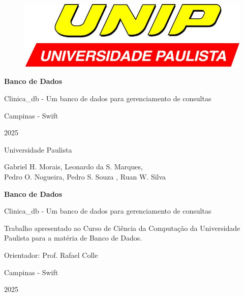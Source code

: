 \documentclass[a4paper,12pt]{article}
\begin{document}
\begin{titlepage}
    \centering
    \begin{figure}[H]
        \centering
        \includegraphics{logoUNIP.jpg}
    \end{figure}
    \vspace{1.5cm}
    \vspace{3cm}
    {\Huge \textbf{Banco de Dados} \par}
    \vspace{1cm}
    {\Large Clinica\_db - Um banco de dados para gerenciamento de consultas\par}
    \vfill
    {\Large Campinas - Swift \par}
    {\Large 2025 \par}
\end{titlepage}

\begin{titlepage}
    \centering
    {\Large Universidade Paulista \par}
    \vspace{1.5cm}
    {\large Gabriel H. Morais, Leonardo da S. Marques, \\Pedro O. Nogueira, Pedro S. Souza , Ruan W. Silva \par}

    \vspace{3cm}
    {\Huge \textbf{Banco de Dados} \par}
    \vspace{1cm}
    {\Large Clinica\_db - Um banco de dados para gerenciamento de consultas \par}
    \vfill
    {\large Trabalho apresentado ao Curso de Ciência da Computação da Universidade Paulista para a matéria de Banco de Dados.\par}
    \vspace{0.5cm}
    {\large Orientador: Prof. Rafael Colle \par}
    \vfill
    {\Large Campinas - Swift \par}
    {\Large 2025 \par}
\end{titlepage}
\end{document}
